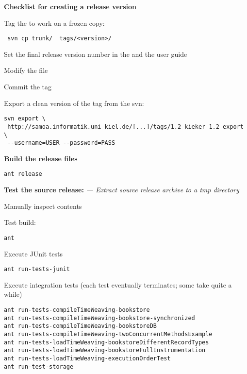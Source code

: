 \textbf{Checklist for creating a release version}

\begin{compactenum}
\item Tag the  to work on a frozen copy:
\setBashListing
\begin{lstlisting}
 svn cp trunk/  tags/<version>/
\end{lstlisting}
\item Set the final release version number in the  and the user guide
\item Modify the  file
\item Commit the tag
\item Export a clean version of the tag from the svn:
\setBashListing
\begin{lstlisting}
svn export \
 http://samoa.informatik.uni-kiel.de/[...]/tags/1.2 kieker-1.2-export \
 --username=USER --password=PASS
\end{lstlisting}
\item \textbf{Build the release files}
\setBashListing
\begin{lstlisting}
ant release
\end{lstlisting}
\item \textbf{Test the source release:} \textit{--- Extract source release archive to a tmp directory}
\begin{compactenum}
\item Manually inspect contents
\item Test build:
\setBashListing
\begin{lstlisting}
ant
\end{lstlisting}
\item Execute JUnit tests
\setBashListing
\begin{lstlisting}
ant run-tests-junit
\end{lstlisting}
\item Execute integration tests (each test eventually terminates; some take quite a while)
\setBashListing
\begin{lstlisting}
ant run-tests-compileTimeWeaving-bookstore
ant run-tests-compileTimeWeaving-bookstore-synchronized
ant run-tests-compileTimeWeaving-bookstoreDB
ant run-tests-compileTimeWeaving-twoConcurrentMethodsExample
ant run-tests-loadTimeWeaving-bookstoreDifferentRecordTypes
ant run-tests-loadTimeWeaving-bookstoreFullInstrumentation
ant run-tests-loadTimeWeaving-executionOrderTest
ant run-test-storage
\end{lstlisting}
\end{compactenum}


\end{compactenum}
